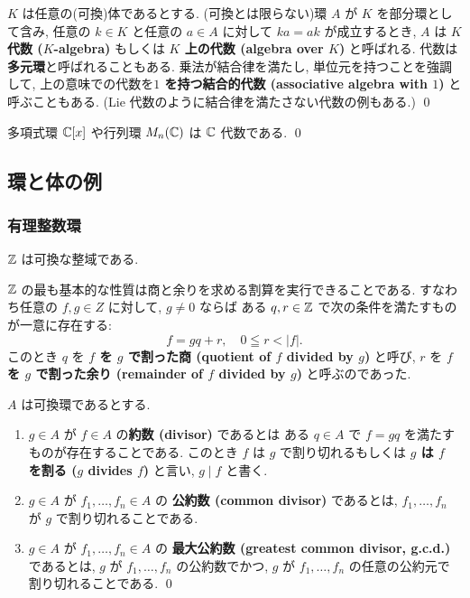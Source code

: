 \documentclass[12pt,twoside]{jarticle}
\begin{document}
\begin{definition}[代数]
 $K$ は任意の(可換)体であるとする.
 (可換とは限らない)環 $A$ が $K$ を部分環として含み, 
 任意の $k\in K$ と任意の $a\in A$ に対して $ka=ak$ が成立するとき, 
 $A$ は {\bf $K$ 代数 ($K$-algebra)} %
 もしくは {\bf $K$ 上の代数 (algebra over $K$)} と呼ばれる.
 代数は{\bf 多元環}と呼ばれることもある.
 乗法が結合律を満たし, 単位元を持つことを強調して, 
 上の意味での代数を{\bf $1$ を持つ結合的代数 (associative algebra with $1$)}
 と呼ぶこともある.
 (Lie 代数のように結合律を満たさない代数の例もある.)
 \qed
\end{definition}

\begin{example}
 多項式環 ${\mathbb C}[x]$ や行列環 $M_n({\mathbb C})$ は ${\mathbb C}$ 代数である. \qed
\end{example}


\subsection{環と体の例}


\subsubsection{有理整数環}

${\mathbb Z}$ は可換な整域である.

${\mathbb Z}$ の最も基本的な性質は商と余りを求める割算を実行できることである.
すなわち任意の $f,g\in Z$ に対して, $g\ne 0$ ならば
ある $q,r\in{\mathbb Z}$ で次の条件を満たすものが一意に存在する:
\begin{equation*}
 f = gq + r, \quad 0\leqq r < |f|.
\end{equation*}
このとき $q$ を %
{\bf $f$ を $g$ で割った商 (quotient of $f$ divided by $g$)} と呼び, 
$r$ を %
{\bf $f$ を $g$ で割った余り (remainder of $f$ divided by $g$)} 
と呼ぶのであった.


\begin{definition}[最大公約数]
 $A$ は可換環であるとする.
 \begin{enumerate}
 \item $g\in A$ が $f\in A$ の{\bf 約数 (divisor)} であるとは %
  ある $q\in A$ で $f=gq$ を満たすものが存在することである.
  このとき $f$ は $g$ で割り切れるもしくは
  {\bf $g$ は $f$ を割る ($g$ divides $f$)} と言い, 
  $g\mid f$ と書く.
 \item $g\in A$ が $f_1,\ldots,f_n\in A$ の
  {\bf 公約数 (common divisor)} であるとは, %
  $f_1,\ldots,f_n$ が $g$ で割り切れることである.
 \item $g\in A$ が $f_1,\ldots,f_n\in A$ の
  {\bf 最大公約数 (greatest common divisor, g.c.d.)} であるとは, %
  $g$ が $f_1,\ldots,f_n$ の公約数でかつ, 
  $g$ が $f_1,\ldots,f_n$ の任意の公約元で割り切れることである.
 \qed
 \end{enumerate}
\end{definition}
\end{document}
